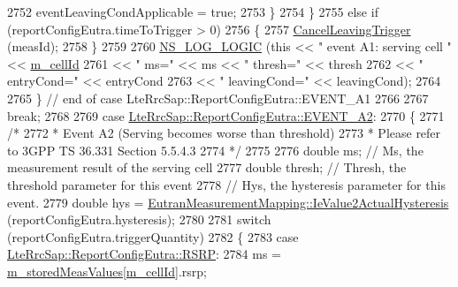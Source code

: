 \begin{DoxyCode}
2752                 eventLeavingCondApplicable = \textcolor{keyword}{true};
2753               \}
2754           \}
2755         \textcolor{keywordflow}{else} \textcolor{keywordflow}{if} (reportConfigEutra.timeToTrigger > 0)
2756           \{
2757             \hyperlink{classns3_1_1LteUeRrc_a3e35c475cfb5361222f1556bfbd3111d}{CancelLeavingTrigger} (measId);
2758           \}
2759 
2760         \hyperlink{group__logging_ga88acd260151caf2db9c0fc84997f45ce}{NS\_LOG\_LOGIC} (\textcolor{keyword}{this} << \textcolor{stringliteral}{" event A1: serving cell "} << \hyperlink{classns3_1_1LteUeRrc_aa9d3317734eea9158371d9fccf3a0c48}{m\_cellId}
2761                            << \textcolor{stringliteral}{" ms="} << ms << \textcolor{stringliteral}{" thresh="} << thresh
2762                            << \textcolor{stringliteral}{" entryCond="} << entryCond
2763                            << \textcolor{stringliteral}{" leavingCond="} << leavingCond);
2764 
2765       \} \textcolor{comment}{// end of case LteRrcSap::ReportConfigEutra::EVENT\_A1}
2766 
2767       \textcolor{keywordflow}{break};
2768 
2769     \textcolor{keywordflow}{case} \hyperlink{structns3_1_1LteRrcSap_1_1ReportConfigEutra_ab8152dc095987f60bee2e9115046902fa11aae7a908ccf8a73b5aeed0cd8be53e}{LteRrcSap::ReportConfigEutra::EVENT\_A2}:
2770       \{
2771         \textcolor{comment}{/*}
2772 \textcolor{comment}{         * Event A2 (Serving becomes worse than threshold)}
2773 \textcolor{comment}{         * Please refer to 3GPP TS 36.331 Section 5.5.4.3}
2774 \textcolor{comment}{         */}
2775 
2776         \textcolor{keywordtype}{double} ms; \textcolor{comment}{// Ms, the measurement result of the serving cell}
2777         \textcolor{keywordtype}{double} thresh; \textcolor{comment}{// Thresh, the threshold parameter for this event}
2778         \textcolor{comment}{// Hys, the hysteresis parameter for this event.}
2779         \textcolor{keywordtype}{double} hys = \hyperlink{classns3_1_1EutranMeasurementMapping_ac0c6d0adbba21c8531600fed399f9f21}{EutranMeasurementMapping::IeValue2ActualHysteresis}
       (reportConfigEutra.hysteresis);
2780 
2781         \textcolor{keywordflow}{switch} (reportConfigEutra.triggerQuantity)
2782           \{
2783           \textcolor{keywordflow}{case} \hyperlink{structns3_1_1LteRrcSap_1_1ReportConfigEutra_a82343ddf526faba0483431ea5882a3efa5b7591e86ab7bcefc7fe1528762114d7}{LteRrcSap::ReportConfigEutra::RSRP}:
2784             ms = \hyperlink{classns3_1_1LteUeRrc_a93094dcd5c235b2e2a8a299125100a57}{m\_storedMeasValues}[\hyperlink{classns3_1_1LteUeRrc_aa9d3317734eea9158371d9fccf3a0c48}{m\_cellId}].rsrp;

\end{DoxyCode}
